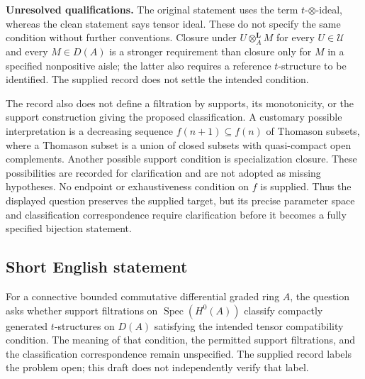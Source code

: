 \documentclass[11pt]{article}
\begin{document}
\textbf{Unresolved qualifications.} The original statement uses the term \(t\)-\(\otimes\)-ideal, whereas the clean statement says tensor ideal. These do not specify the same condition without further conventions. Closure under \(U\otimes_A^{\mathbf L}M\) for every \(U\in\mathcal U\) and every \(M\in D(A)\) is a stronger requirement than closure only for \(M\) in a specified nonpositive aisle; the latter also requires a reference \(t\)-structure to be identified. The supplied record does not settle the intended condition.

The record also does not define a filtration by supports, its monotonicity, or the support construction giving the proposed classification. A customary possible interpretation is a decreasing sequence \(f(n+1)\subseteq f(n)\) of Thomason subsets, where a Thomason subset is a union of closed subsets with quasi-compact open complements. Another possible support condition is specialization closure. These possibilities are recorded for clarification and are not adopted as missing hypotheses. No endpoint or exhaustiveness condition on \(f\) is supplied. Thus the displayed question preserves the supplied target, but its precise parameter space and classification correspondence require clarification before it becomes a fully specified bijection statement.
\subsection{Short English statement}
For a connective bounded commutative differential graded ring \(A\), the question asks whether support filtrations on \(\operatorname{Spec}(H^0(A))\) classify compactly generated \(t\)-structures on \(D(A)\) satisfying the intended tensor compatibility condition. The meaning of that condition, the permitted support filtrations, and the classification correspondence remain unspecified. The supplied record labels the problem open; this draft does not independently verify that label.
\end{document}
